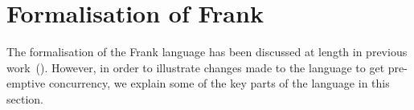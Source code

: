\documentclass[msc,deptreport,cs]{infthesis} %
\begin{document}
\chapter{Formalisation of Frank}


The formalisation of the Frank language has been discussed at length in previous
work~(\cite{convent2020doo}). However, in order to illustrate changes made to
the language to get pre-emptive concurrency, we explain some of the key parts of
the language in this section.
\end{document}
